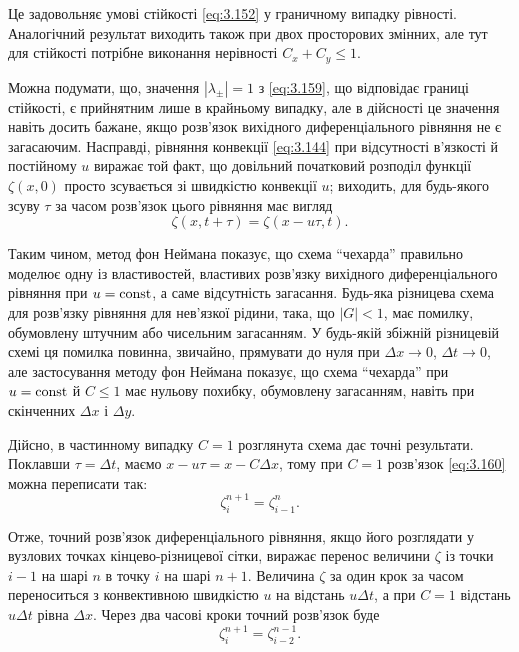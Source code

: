 Це задовольняє умові стійкості \eqref{eq:3.152} у граничному випадку рівності. Аналогічний результат виходить також при двох просторових змінних, але тут для стійкості потрібне виконання нерівності $C_x + C_y \le 1$. \medskip

Можна подумати, що, значення $|\lambda_\pm| = 1$ з \eqref{eq:3.159}, що відповідає границі стійкості, є прийнятним лише в крайньому випадку, але в дійсності це значення навіть досить бажане, якщо розв'язок вихідного диференціального рівняння не є загасаючим. Насправді, рівняння конвекції \eqref{eq:3.144} при відсутності в'язкості й постійному $u$ виражає той факт, що довільний початковий розподіл функції $\zeta(x, 0)$ просто зсувається зі швидкістю конвекції $u$; виходить, для будь-якого зсуву $\tau$ за часом розв'язок цього рівняння має вигляд
\begin{equation}
    \label{eq:3.160}
    \zeta(x, t + \tau) = \zeta(x - u \tau, t).
\end{equation}

Таким чином, метод фон Неймана показує, що схема ``чехарда'' правильно моделює одну із властивостей, властивих розв'язку вихідного диференціального рівняння при $u = \operatorname{const}$, а саме відсутність загасання. Будь-яка різницева схема для розв'язку рівняння для нев'язкої рідини, така, що $|G| < 1$, має помилку, обумовлену штучним або чисельним загасанням. У будь-якій збіжній різницевій схемі ця помилка повинна, звичайно, прямувати до нуля при $\Delta x \to 0$, $\Delta t \to 0$, але застосування методу фон Неймана показує, що схема ``чехарда'' при $u = \operatorname{const}$ й $C \le 1$ має нульову похибку, обумовлену загасанням, навіть при скінченних $\Delta x$ і $\Delta y$. \medskip

Дійсно, в частинному випадку $C = 1$ розглянута схема дає точні результати. Поклавши $\tau = \Delta t$, маємо $x - u \tau = x - C \Delta x$, тому при $C = 1$ розв'язок \eqref{eq:3.160} можна переписати так:
\begin{equation}
    \label{eq:3.161}
    \zeta_i^{n + 1} = \zeta_{i - 1}^n.
\end{equation}

Отже, точний розв'язок диференціального рівняння, якщо його розглядати у вузлових точках кінцево-різницевої сітки, виражає перенос величини $\zeta$ із точки $i - 1$ на шарі $n$ в точку  $i$ на шарі $n + 1$. Величина $\zeta$ за один крок за часом переноситься з конвективною швидкістю $u$ на відстань $u \Delta t$, а при $C = 1$ відстань $u \Delta t$ рівна $\Delta x$. Через два часові кроки точний розв'язок буде
\begin{equation}
    \label{eq:3.162}
    \zeta_i^{n + 1} = \zeta_{i - 2}^{n - 1}.
\end{equation}

